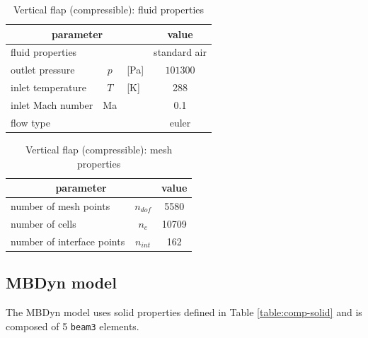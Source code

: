 \begin{table}[!htb]
	\begin{center}
		\begin{tabular}{ l c l | c } 
			\multicolumn{3}{c|}{parameter} & value  \\ 
			\hline
			fluid properties  &  &  & standard air   \\
			outlet pressure & $p$& [\si{Pa}] & $101300$  \\
			inlet temperature & $T$ & [\si{K}] & 288  \\
			inlet Mach number &  Ma &  & 0.1 \\
			flow type & & & euler \\
		\end{tabular}
	\end{center}
	\caption{Vertical flap (compressible): fluid properties}
	\label{table:comp-fluid}
\end{table}



\begin{table}[!htb]
	\begin{center}
		\begin{tabular}{ l c | c } 
			\multicolumn{2}{c|}{parameter} & value   \\ 
			\hline
			number of mesh points  & $n_{dof}$ & 5580     \\
			number of cells & $n_c$ & 10709  \\
			number of interface points  & $n_{int}$ & 162  \\			
		\end{tabular}
	\end{center}
	\caption{Vertical flap (compressible): mesh properties}
	\label{table:comp-mesh}
\end{table}


\subsection{MBDyn model}


The MBDyn model uses solid properties defined in Table \ref{table:comp-solid} and is composed of 5 \texttt{beam3} elements. 

